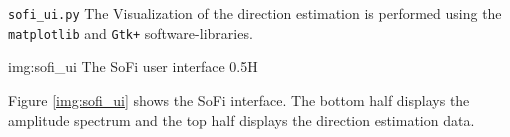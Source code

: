 \begin{subchapter}{\texttt{sofi\_ui.py}}
  The Visualization of the direction estimation is performed
  using the \texttt{matplotlib} and \texttt{Gtk+} software-libraries.

               {img:sofi_ui}
               {The SoFi user interface}
               {0.5}{H}

  Figure \ref{img:sofi_ui} shows the SoFi interface.
  The bottom half displays the amplitude spectrum and
  the top half displays the direction estimation data.
\end{subchapter}
